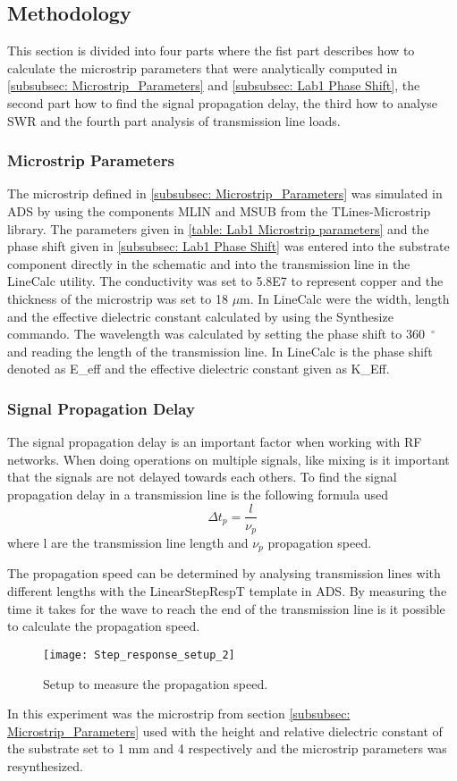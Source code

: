 \documentclass[report.tex]{subfiles}
\begin{document}
\subsection{Methodology}\label{sec:Lab1 methodology}
This section is divided into four parts where the fist part describes how to calculate the microstrip parameters that were analytically computed in \ref{subsubsec: Microstrip_Parameters} and \ref{subsubsec: Lab1 Phase Shift}, the second part how to find the signal propagation delay, the third how to analyse SWR and the fourth part analysis of transmission line loads.
\subsubsection{Microstrip Parameters}
The microstrip defined in \ref{subsubsec: Microstrip_Parameters} was simulated in ADS by using the components MLIN and MSUB from the TLines-Microstrip library. The parameters given in \ref{table: Lab1 Microstrip parameters} and the phase shift given in \ref{subsubsec: Lab1 Phase Shift} was entered into the substrate component directly in the schematic and into the transmission line in the LineCalc utility. The conductivity was set to 5.8E7 to represent copper and the thickness of the microstrip was set to 18 $\mu$m. In LineCalc were the width, length and the effective dielectric constant calculated by using the Synthesize commando. The wavelength was calculated by setting the phase shift to 360~$^\circ$ and reading the length of the transmission line. In LineCalc is the phase shift denoted as E\_eff and the effective dielectric constant given as K\_Eff.

\subsubsection{Signal Propagation Delay}
The signal propagation delay is an important factor when working with RF networks. When doing operations on multiple signals, like mixing is it important that the signals are not delayed towards each others. To find the signal propagation delay in a transmission line is the following formula used
\begin{equation}\label{eq: Lab1 propagation delay}
	\Delta t_p = \dfrac{l}{\nu_p}
\end{equation}
where l are the transmission line length and $\nu_p$ propagation speed.

The propagation speed can be determined by analysing transmission lines with different lengths with the LinearStepRespT template in ADS. By measuring the time it takes for the wave to reach the end of the transmission line is it possible to calculate the propagation speed.
\begin{figure}[H]
	\texttt{[image: Step\_response\_setup\_2]}
	\caption{Setup to measure the propagation speed.}
\end{figure}
In this experiment was the microstrip from section \ref{subsubsec: Microstrip_Parameters} used with the height and relative dielectric constant of the substrate set to 1 mm and 4 respectively and the microstrip parameters was resynthesized.
\end{document}
